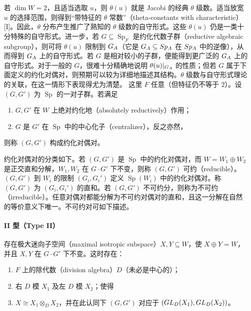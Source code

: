 若 $\dim W=2$，且适当选取 $u$，则 $\theta(u)$ 就是 Jacobi 的经典 $\theta$ 级数。适当放宽 $u$ 的选择范围，则得到“带特征的 $\theta$ 常数”（theta-constants with characteristic）[I]。因此，$\theta$ 分布产生推广了熟知的 $\theta$ 级数的自守形式。这些 $\theta(u)$ 仍是一类十分特殊的自守形式。进一步，若 $G\subseteq\operatorname{Sp}_F$ 是约化代数子群（reductive algebraic subgroup），则可将 $\theta(u)$ 限制到 $G_A$（它是 $G_A\subseteq Sp_A$ 在 $Sp_A$ 中的逆像），从而得到 $G_A$ 上的自守形式。若 $G$ 是相对较小的子群，便能得到更广泛的 $G_A$ 上的自守形式。对于一般的 $G$，很难十分精确地说明 $\theta(u)|_{G_A}$ 的性质；但若 $G$ 属于下面定义的约化对偶对，则预期可以较为详细地描述其结构。$\theta$ 级数与自守形式理论的关联，在这一情形下表现得尤为清楚。
这里 $F$ 任意（但特征仍不等于 $2$）。设 $(G,G')$ 为 $\operatorname{Sp}$ 的一对子群。若满足
\begin{enumerate}
\item[(i)] $G,G'$ 在 $W$ 上绝对约化地（absolutely reductively）作用；
\item[(ii)] $G$ 是 $G'$ 在 $\operatorname{Sp}$ 中的中心化子（centralizer），反之亦然，
\end{enumerate}
则称 $(G,G')$ 构成约化对偶对。

约化对偶对的分类如下。若 $(G,G')$ 是 $\operatorname{Sp}$ 中的约化对偶对，而 $W=W_1\oplus W_2$ 是正交直和分解，$W_1,W_2$ 在 $G\cdot G'$ 下不变，则称 $(G,G')$ 可约（reducible）。$(G,G')$ 到 $W_i$ 的限制 $(G_i,G_i')$ 定义 $\operatorname{Sp}(W_i)$ 中的约化对偶对。称 $(G,G')$ 为 $(G_i,G_i')$ 的直和。若 $(G,G')$ 不可约分，则称为不可约（irreducible）。任意对偶对都能分解为不可约对偶对的直和，且这一分解在自然的等价意义下唯一。不可约对可如下描述。

\paragraph*{II 型（Type II）}
存在极大迷向子空间（maximal isotropic subspace）$X,Y\subseteq W$，使 $X\oplus Y=W$，并且 $X,Y$ 在 $G\cdot G'$ 下不变。这时存在：
\begin{enumerate}
\item[(a)] $F$ 上的除代数（division algebra）$D$（未必是中心的）；
\item[(b)] 右 $D$ 模 $X_1$ 及左 $D$ 模 $X_2$；使得
\item[(c)] $X\cong X_1\otimes_D X_2$，并在此认同下 $(G,G')$ 对应于 $(GL_D(X_1),GL_D(X_2))$。
\end{enumerate}
